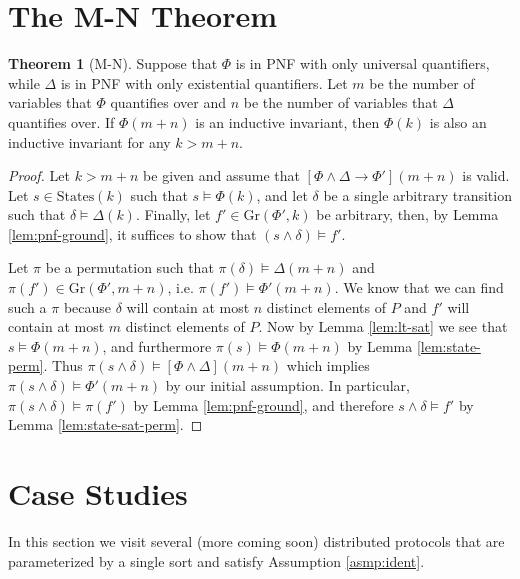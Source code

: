 \documentclass[12pt]{article}
\theoremstyle{definition}
\newtheorem{theorem}{Theorem}
\theoremstyle{remark}
\newcommand{\states}{\text{States}}
\newcommand{\gr}{\text{Gr}}
\begin{document}
\section{The M-N Theorem}
\begin{theorem}[M-N]
  Suppose that $\Phi$ is in PNF with only universal quantifiers, while $\Delta$ is in PNF with only existential quantifiers.  Let $m$ be the number of variables that $\Phi$ quantifies over and $n$ be the number of variables that $\Delta$ quantifies over.  If $\Phi(m+n)$ is an inductive invariant, then $\Phi(k)$ is also an inductive invariant for any $k>m+n$.
\end{theorem}
\begin{proof}
  Let $k>m+n$ be given and assume that $[\Phi\land\Delta \rightarrow \Phi'](m+n)$ is valid.  Let $s \in \states(k)$ such that $s \models \Phi(k)$, and let $\delta$ be a single arbitrary transition such that $\delta \models \Delta(k)$.  Finally, let $f' \in \gr(\Phi',k)$ be arbitrary, then, by Lemma \ref{lem:pnf-ground}, it suffices to show that $(s \land \delta) \models f'$.

  Let $\pi$ be a permutation such that $\pi(\delta) \models \Delta(m+n)$ and $\pi(f') \in \gr(\Phi',m+n)$, i.e. $\pi(f') \models \Phi'(m+n)$.  We know that we can find such a $\pi$ because $\delta$ will contain at most $n$ distinct elements of $P$ and $f'$ will contain at most $m$ distinct elements of $P$.  Now by Lemma \ref{lem:lt-sat} we see that $s \models \Phi(m+n)$, and furthermore $\pi(s) \models \Phi(m+n)$ by Lemma \ref{lem:state-perm}.  Thus $\pi(s \land \delta) \models [\Phi\land\Delta](m+n)$ which implies $\pi(s \land \delta) \models \Phi'(m+n)$ by our initial assumption.  In particular, $\pi(s \land \delta) \models \pi(f')$ by Lemma \ref{lem:pnf-ground}, and therefore $s \land \delta \models f'$ by Lemma \ref{lem:state-sat-perm}.
\end{proof}



\section{Case Studies}
In this section we visit several (more coming soon) distributed protocols that are parameterized by a single sort and satisfy Assumption \ref{asmp:ident}.
\end{document}
